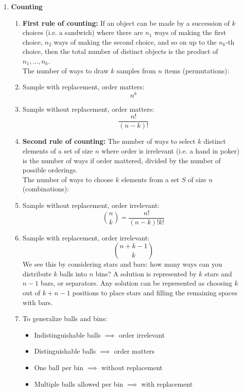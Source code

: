 \documentclass[10pt]{article}
\begin{document}
\begin{multicols}{2}
\begin{enumerate}
        \item \textbf{Counting}
        \begin{enumerate}
            \item \textbf{First rule of counting:} If an object can be made by a succession of $k$ choices (i.e. a sandwich) where there are $n_1$ ways of making the first choice, $n_2$ ways of making the second choice, and so on up to the $n_k$-th choice, then the total number of distinct objects is the product of $n_1, \hdots, n_k$. \\[8 pt]
            The number of ways to draw $k$ samples from $n$ items (permutations):
            \item Sample with replacement, order matters: $$n^k$$
            \item Sample without replacement, order matters: $$\frac{n!}{(n-k)!}$$
            \item \textbf{Second rule of counting:} The number of ways to select $k$ distinct elements of a set of size $n$ where order is irrelevant (i.e. a hand in poker) is the number of ways if order mattered, divided by the number of possible orderings. \\[8 pt]
            The number of ways to choose $k$ elements from a set $S$ of size $n$ (combinations):
            \item Sample without replacement, order irrelevant:
            $$ {n \choose k} = \frac{n!}{(n-k)!k!}$$
            \item Sample with replacement, order irrelevant:
            $$ {n+k-1 \choose k}$$
            We see this by considering stars and bars: how many ways can you distribute $k$ balls into $n$ bins? A solution is represented by $k$ stars and $n-1$ bars, or separators. Any solution can be represented as choosing $k$ out of $k+n-1$ positions to place stars and filling the remaining spaces with bars.
            \item To generalize balls and bins:
            \begin{itemize}
                \item Indistinguishable balls $\implies$ order irrelevant
                \item Distinguishable balls $\implies$ order matters 
                \item One ball per bin $\implies$ without replacement
                \item Multiple balls allowed per bin $\implies$ with replacement
            \end{itemize}
             

\end{enumerate}
\end{enumerate}
\end{multicols}
\end{document}
